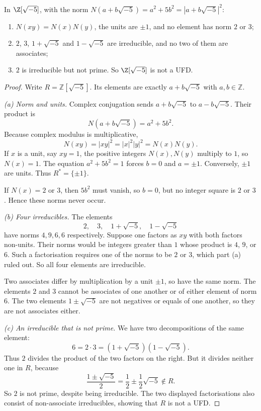 \begin{proposition}\label{prop:zm5}
In $\Z[\sqrt{-5}]$, with the norm $N(a+b\sqrt{-5})=a^2+5b^2=|a+b\sqrt{-5}|^2$:
\begin{enumerate}[label=(\alph*)]
\item $N(xy)=N(x)N(y)$, the units are $\pm1$, and no element has norm $2$ or $3$;
\item $2$, $3$, $1+\sqrt{-5}$ and $1-\sqrt{-5}$ are irreducible, and no two of them are associates;
\item $2$ is irreducible but not prime. So $\Z[\sqrt{-5}]$ is not a UFD.
\end{enumerate}
\end{proposition}
\begin{proof}
Write $R=\mathbb Z[\sqrt{-5}]$.
Its elements are exactly $a+b\sqrt{-5}$
with $a,b\in\mathbb Z$.

\emph{(a) Norm and units.}
Complex conjugation sends
$a+b\sqrt{-5}$ to $a-b\sqrt{-5}$.
Their product is
\[
N(a+b\sqrt{-5})=a^2+5b^2.
\]
Because complex modulus is multiplicative,
\[
N(xy)=|xy|^2=|x|^2|y|^2=N(x)N(y).
\]
If $x$ is a unit, say $xy=1$, the
positive integers $N(x),N(y)$
multiply to $1$, so $N(x)=1$.
The equation $a^2+5b^2=1$
forces $b=0$ and $a=\pm1$.
Conversely, $\pm1$ are units.
Thus $R^*=\{\pm1\}$.

If $N(x)=2$ or $3$, then $5b^2$
must vanish, so $b=0$, but no
integer square is $2$ or $3$.
Hence these norms never occur.

\emph{(b) Four irreducibles.}
The elements
\[
2,\quad3,\quad1+\sqrt{-5},\quad
1-\sqrt{-5}
\]
have norms $4,9,6,6$ respectively.
Suppose one factors as $xy$ with
both factors non-units. Their norms
would be integers greater than $1$
whose product is $4$, $9$, or $6$.
Such a factorisation requires one of
the norms to be $2$ or $3$,
which part (a) ruled out.
So all four elements are irreducible.

Two associates differ by multiplication
by a unit $\pm1$, so have the same norm.
The elements $2$ and $3$ cannot be
associates of one another or of either
element of norm $6$. The two elements
$1\pm\sqrt{-5}$ are not negatives or
equals of one another, so they are
not associates either.

\emph{(c) An irreducible that is not prime.}
We have two decompositions of the same element:
\[
6=2\cdot3=(1+\sqrt{-5})(1-\sqrt{-5}).
\]
Thus $2$ divides the product of the two
factors on the right. But it divides
neither one in $R$, because
\[
\frac{1\pm\sqrt{-5}}2
=\frac12\pm\frac12\sqrt{-5}
\notin R.
\]
So $2$ is not prime, despite being
irreducible. The two displayed
factorisations also consist of
non-associate irreducibles, showing
that $R$ is not a UFD.
\end{proof}

